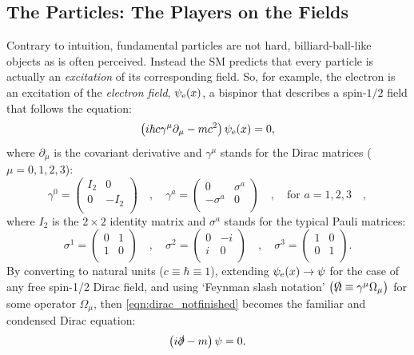 \subsection{The Particles: The Players on the Fields}
Contrary to intuition, fundamental particles are not hard, billiard-ball-like objects as is often perceived.
Instead the SM predicts that every particle is actually an \emph{excitation} of its corresponding field.
So, for example, the electron is an excitation of the \emph{electron field}, $\psi_{\mathrm{e}}(x)$, a bispinor that describes a spin-$1/2$ field that follows the equation: 
\begin{equation}
    \left( i\hbar c \gamma^{\mu}{\partial}_{\mu} - mc^{2} \right)\psi_{\mathrm{e}}(x) = 0,
    \label{eqn:dirac_notfinished}
\end{equation}
where $\partial_\mu$ is the covariant derivative and $\gamma^\mu$ stands for the Dirac matrices ($\mu = 0,1,2,3$):
\begin{equation}
    \gamma^0 = 
    \begin{pmatrix}
        I_{2} & 0 \\
        0  & -I_{2} \\
    \end{pmatrix}
    \quad , \quad
    \gamma^a = 
    \begin{pmatrix}
        0 & \sigma^a \\
        -\sigma^a  & 0 \\
    \end{pmatrix}
    \quad , \quad \text{for } a = 1,2,3 \quad ,
    \label{eqn:gamma_matrices}
\end{equation}
where $I_2$ is the $2 \times 2$ identity matrix and $\sigma^a$ stands for the typical Pauli matrices:
\begin{equation*}
    \sigma^1 = 
    \begin{pmatrix}
        0 & 1 \\
        1  & 0 \\
    \end{pmatrix}
    \quad , \quad
    \sigma^2 = 
    \begin{pmatrix}
        0 & -i \\
        i  & 0 \\
    \end{pmatrix}
    \quad , \quad
    \sigma^3 = 
    \begin{pmatrix}
        1 & 0 \\
        0  & 1 \\
    \end{pmatrix}
    .
\end{equation*}
By converting to natural units ($c\equiv \hbar \equiv 1$),
extending $\psi_{\mathrm{e}}(x) \to \psi$ for the case of any free spin-1/2 Dirac field,
and using `Feynman slash notation' $\left( {\slashed \Omega} \equiv \gamma^\mu \Omega_\mu \right)$ for some operator $\Omega_\mu$,
then \cref{eqn:dirac_notfinished} becomes the familiar and condensed Dirac equation:
\begin{equation}
    \left( i {\slashed \partial} - m \right) \psi = 0.
    \label{eqn:dirac}
\end{equation}
    
